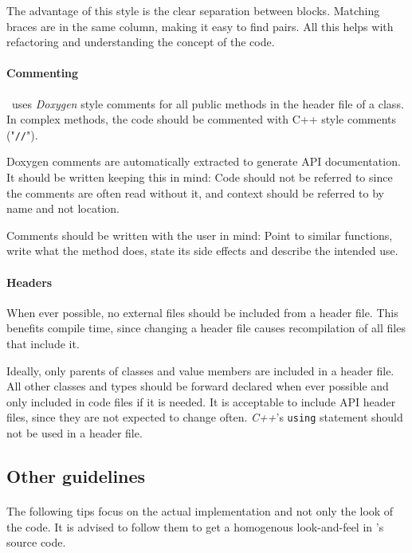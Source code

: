 The advantage of this style is the clear separation between blocks.
Matching braces are in the same column, making it easy to find pairs.
All this helps with refactoring and understanding the concept of the code.


\paragraph{Commenting}
\ER\ uses \textit{Doxygen} style comments for all public methods in the header file of a class.
In complex methods, the code should be commented with C++ style comments ("\texttt{//}").

Doxygen comments are automatically extracted to generate API documentation.
It should be written keeping this in mind:
Code should not be referred to since the comments are often read without it, and context should be referred to by name and not location.

Comments should be written with the user in mind:
Point to similar functions, write what the method does, state its side effects and describe the intended use.


\paragraph{Headers}
When ever possible, no external files should be included from a header file.
This benefits compile time, since changing a header file causes recompilation of all files that include it.

Ideally, only parents of classes and value members are included in a header file.
All other classes and types should be forward declared when ever possible and only included in code files if it is needed.
It is acceptable to include API header files, since they are not expected to change often.
\textit{C++}'s \texttt{using} statement should not be used in a header file.

\subsection{Other guidelines}
\paragraph{}
The following tips focus on the actual implementation and not only the look of the code.
It is advised to follow them to get a homogenous look-and-feel in \ER's source code.

